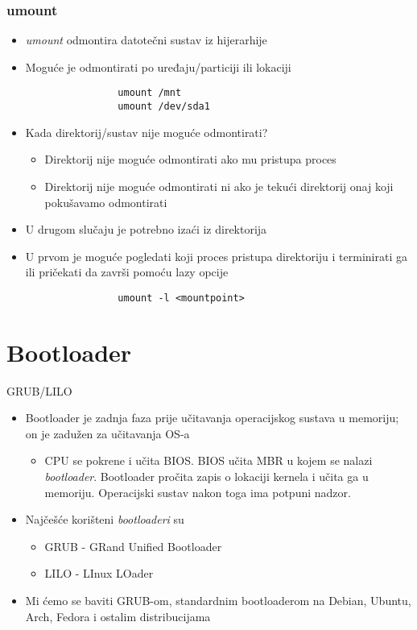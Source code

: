 \documentclass[croatian,t]{beamer} %
\begin{document}
	\begin{frame}[fragile]
	\frametitle{umount}
		\begin{itemize}
			\item \textit{umount} odmontira datotečni sustav iz hijerarhije
			\item Moguće je odmontirati po uređaju/particiji ili lokaciji
			\begin{lstlisting}
				umount /mnt
				umount /dev/sda1
			\end{lstlisting}
			\item Kada direktorij/sustav nije moguće odmontirati?
			\begin{itemize}
				\item Direktorij nije moguće odmontirati ako mu pristupa proces
				\item Direktorij nije moguće odmontirati ni ako je tekući direktorij onaj koji pokušavamo odmontirati
			\end{itemize}
			\item U drugom slučaju je potrebno izaći iz direktorija
			\item U prvom je moguće pogledati koji proces pristupa direktoriju i terminirati ga ili pričekati da završi pomoću lazy opcije
			\begin{lstlisting}
				umount -l <mountpoint>
			\end{lstlisting}
		\end{itemize}
	\end{frame}	
	
	\section{Bootloader}
	\begin{frame}{GRUB/LILO}
		\begin{itemize}
			\item Bootloader je zadnja faza prije učitavanja operacijskog sustava u memoriju; on je zadužen za učitavanja OS-a
			\begin{itemize}
				\item CPU se pokrene i učita BIOS. BIOS učita MBR u kojem se nalazi \textit{bootloader}. Bootloader pročita zapis o lokaciji kernela i učita ga u memoriju. Operacijski sustav nakon toga ima potpuni nadzor.
			\end{itemize}
			\item Najčešće korišteni \emph{bootloaderi} su 
			\begin{itemize}
				\item GRUB - GRand Unified Bootloader
				\item LILO - LInux LOader
			\end{itemize}
			\item Mi ćemo se baviti GRUB-om, standardnim bootloaderom na Debian, Ubuntu, Arch, Fedora i ostalim distribucijama 
		\end{itemize}
	\end{frame}	
	
\end{document}

